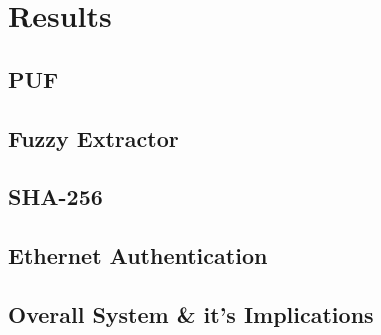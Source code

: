 
\chapter{Results} %

\label{ch:results} %


\section{PUF}

\section{Fuzzy Extractor}

\section{SHA-256}

\section{Ethernet Authentication}

\section{Overall System \& it's Implications}


